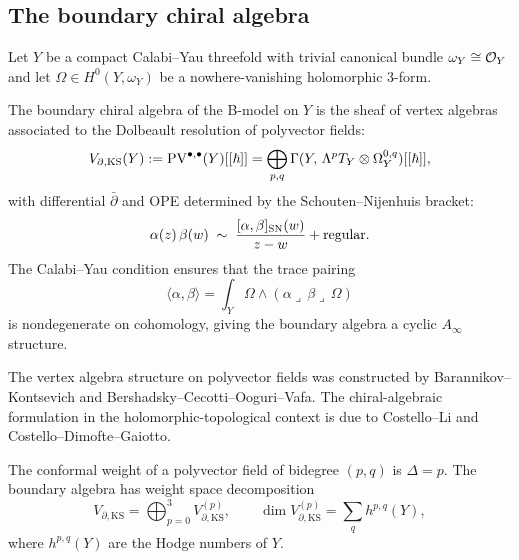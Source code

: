 \subsection{The boundary chiral algebra}

Let $Y$ be a compact Calabi--Yau threefold with trivial canonical
bundle $\omega_Y\cong\mathcal O_Y$ and let $\Omega\in H^0(Y,\omega_Y)$
be a nowhere-vanishing holomorphic $3$-form.

\begin{definition}
The boundary chiral algebra of the B-model on $Y$ is the sheaf of
vertex algebras associated to the Dolbeault resolution of polyvector
fields:
\begin{equation}%
V_{\partial,\mathrm{KS}}(Y)
:= \PV^{\bullet,\bullet}(Y)[[\hbar]]
= \bigoplus_{p,q}
\Gamma(Y,\,\Lambda^p T_Y\otimes\Omega^{0,q}_Y)[[\hbar]],
\end{equation}
with differential $\bar\partial$ and OPE determined by the
Schouten--Nijenhuis bracket:
\begin{equation}%
\alpha(z)\,\beta(w)
\;\sim\;
\frac{[\alpha,\beta]_{\sn}(w)}{z-w}
+ \text{regular}.
\end{equation}
The Calabi--Yau condition ensures that the trace pairing
\begin{equation}%
\langle\alpha,\beta\rangle
= \int_Y \Omega\wedge(\alpha\lrcorner\,\beta\lrcorner\,\Omega)
\end{equation}
is nondegenerate on cohomology, giving the boundary algebra a
cyclic $A_\infty$ structure.
\end{definition}

\begin{remark}
The vertex algebra structure on polyvector fields was constructed
by Barannikov--Kontsevich and Bershadsky--Cecotti--Ooguri--Vafa.
The chiral-algebraic formulation in the holomorphic-topological
context is due to Costello--Li and Costello--Dimofte--Gaiotto.
\end{remark}

\begin{proposition}
The conformal weight of a polyvector field of bidegree $(p,q)$
is $\Delta=p$. The boundary algebra has weight space decomposition
\begin{equation}%
V_{\partial,\mathrm{KS}} = \bigoplus_{p=0}^{3}
V_{\partial,\mathrm{KS}}^{(p)},
\qquad
\dim V_{\partial,\mathrm{KS}}^{(p)}
= \sum_q h^{p,q}(Y),
\end{equation}
where $h^{p,q}(Y)$ are the Hodge numbers of $Y$.
\end{proposition}

